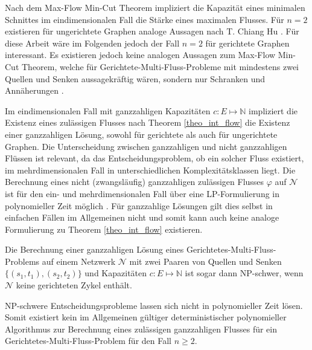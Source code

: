 Nach dem Max-Flow Min-Cut Theorem impliziert die Kapazität eines minimalen Schnittes im eindimensionalen Fall die Stärke eines maximalen Flusses. Für $n=2$ existieren für ungerichtete Graphen analoge Aussagen nach T. Chiang Hu \cite{hu}. Für diese Arbeit wäre im Folgenden jedoch der Fall $n=2$ für gerichtete Graphen interessant. Es existieren jedoch keine analogen Aussagen zum Max-Flow Min-Cut Theorem, welche für Gerichtete-Multi-Fluss-Probleme mit mindestens zwei Quellen und Senken aussagekräftig wären, sondern nur Schranken und Annäherungen \cite{leighton99}.

Im eindimensionalen Fall mit ganzzahligen Kapazitäten $c:E\mapsto\mathbb{N}$ impliziert die Existenz eines zulässigen Flusses nach Theorem \ref{theo_int_flow} die Existenz einer ganzzahligen Lösung, sowohl für gerichtete als auch für ungerichtete Graphen. Die Unterscheidung zwischen ganzzahligen und nicht ganzzahligen Flüssen ist relevant, da das Entscheidungsproblem, ob ein solcher Fluss existiert, im mehrdimensionalen Fall in unterschiedlichen Komplexitätsklassen liegt. Die Berechnung eines nicht (zwangsläufig) ganzzahligen zulässigen Flusses $\varphi$ auf $\mathcal{N}$ ist für den ein- und mehrdimensionalen Fall über eine LP-Formulierung in polynomieller Zeit möglich \cite[Theorem 4.18]{korte12}. Für ganzzahlige Lösungen gilt dies selbst in einfachen Fällen im Allgemeinen nicht und somit kann auch keine analoge Formulierung zu Theorem \ref{theo_int_flow} existieren.

\begin{theorem}\label{np_hard}
Die Berechnung einer ganzzahligen Lösung eines Gerichtetes-Multi-Fluss-Problems auf einem Netzwerk $\mathcal{N}$ mit zwei Paaren von Quellen und Senken $\{(s_1,t_1),(s_2,t_2)\}$ und Kapazitäten $c:E\mapsto\mathbb{N}$ ist sogar dann NP-schwer, wenn $\mathcal{N}$ keine gerichteten Zykel enthält.
\end{theorem}

NP-schwere Entscheidungsprobleme lassen sich nicht in polynomieller Zeit lösen. Somit existiert kein im Allgemeinen gültiger deterministischer polynomieller Algorithmus zur Berechnung eines zulässigen ganzzahligen Flusses für ein Gerichtetes-Multi-Fluss-Problem für den Fall $n\geq2$.


